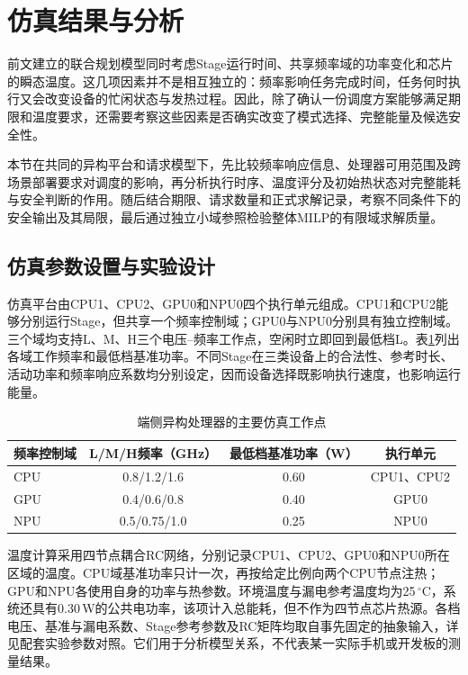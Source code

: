 \section{仿真结果与分析}
\label{sec:experiments}

前文建立的联合规划模型同时考虑Stage运行时间、共享频率域的功率变化和芯片的瞬态温度。这几项因素并不是相互独立的：频率影响任务完成时间，任务何时执行又会改变设备的忙闲状态与发热过程。因此，除了确认一份调度方案能够满足期限和温度要求，还需要考察这些因素是否确实改变了模式选择、完整能量及候选安全性。

本节在共同的异构平台和请求模型下，先比较频率响应信息、处理器可用范围及跨场景部署要求对调度的影响，再分析执行时序、温度评分及初始热状态对完整能耗与安全判断的作用。随后结合期限、请求数量和正式求解记录，考察不同条件下的安全输出及其局限，最后通过独立小域参照检验整体MILP的有限域求解质量。

\subsection{仿真参数设置与实验设计}

仿真平台由CPU1、CPU2、GPU0和NPU0四个执行单元组成。CPU1和CPU2能够分别运行Stage，但共享一个频率控制域；GPU0与NPU0分别具有独立控制域。三个域均支持L、M、H三个电压--频率工作点，空闲时立即回到最低档L。表\ref{tab:exp-platform}列出各域工作频率和最低档基准功率。不同Stage在三类设备上的合法性、参考时长、活动功率和频率响应系数均分别设定，因而设备选择既影响执行速度，也影响运行能量。
\begin{table}[htbp]
\centering
\caption{端侧异构处理器的主要仿真工作点}
\label{tab:exp-platform}
\begin{tabular}{lccc}
\toprule
频率控制域 & L/M/H频率（GHz） & 最低档基准功率（W） & 执行单元 \\
\midrule
CPU & 0.8/1.2/1.6 & 0.60 & CPU1、CPU2 \\
GPU & 0.4/0.6/0.8 & 0.40 & GPU0 \\
NPU & 0.5/0.75/1.0 & 0.25 & NPU0 \\
\bottomrule
\end{tabular}
\end{table}

温度计算采用四节点耦合RC网络，分别记录CPU1、CPU2、GPU0和NPU0所在区域的温度。CPU域基准功率只计一次，再按给定比例向两个CPU节点注热；GPU和NPU各使用自身的功率与热参数。环境温度与漏电参考温度均为25\,$^\circ$C，系统还具有0.30\,W的公共电功率，该项计入总能耗，但不作为四节点芯片热源。各档电压、基准与漏电系数、Stage参考参数及RC矩阵均取自事先固定的抽象输入，详见配套实验参数对照。它们用于分析模型关系，不代表某一实际手机或开发板的测量结果。

